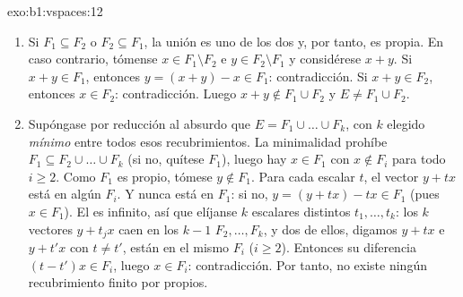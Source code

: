 \begin{solution}{exo:b1:vspaces:12}
\begin{enumerate}
  \item Si $F_1 \subseteq F_2$ o $F_2 \subseteq F_1$, la unión es
        uno de los dos y, por tanto, es propia. En caso contrario,
        tómense $x \in F_1 \setminus F_2$ e $y \in F_2 \setminus F_1$
        y considérese $x + y$. Si $x + y \in F_1$, entonces
        $y = (x + y) - x \in F_1$: contradicción. Si $x + y \in F_2$,
        entonces $x \in F_2$: contradicción. Luego
        $x + y \notin F_1 \cup F_2$ y $E \neq F_1 \cup F_2$.
  \item Supóngase por reducción al absurdo que
        $E = F_1 \cup \dots \cup F_k$, con $k$ elegido \emph{mínimo}
        entre todos esos recubrimientos. La minimalidad prohíbe
        $F_1 \subseteq F_2 \cup \dots \cup F_k$ (si no, quítese
        $F_1$), luego hay $x \in F_1$ con $x \notin F_i$ para todo
        $i \geq 2$. Como $F_1$ es propio, tómese $y \notin F_1$.
        Para cada escalar $t$, el vector $y + t x$ está en algún
        $F_i$. Y nunca está en $F_1$: si no,
        $y = (y + tx) - tx \in F_1$ (pues $x \in F_1$). El 
        es infinito, así que elíjanse $k$ escalares distintos
        $t_1, \dots, t_k$: los $k$ vectores $y + t_j x$ caen en los
        $k - 1$  $F_2, \dots, F_k$, y dos de ellos,
        digamos $y + t x$ e $y + t' x$ con $t \neq t'$, están en el
        mismo $F_i$ ($i \geq 2$). Entonces su diferencia
        $(t - t')x \in F_i$, luego $x \in F_i$: contradicción. Por
        tanto, no existe ningún recubrimiento finito por
         propios.
\end{enumerate}
\end{solution}

